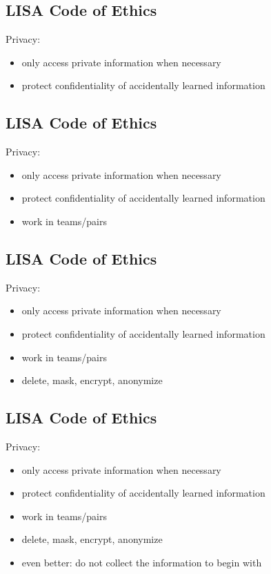 \documentclass[xga]{xdvislides}
\begin{document}
\subsection{LISA Code of Ethics}
Privacy:
\begin{itemize}
	\item only access private information when necessary
	\item protect confidentiality of accidentally learned information
\end{itemize}

\subsection{LISA Code of Ethics}
Privacy:
\begin{itemize}
	\item only access private information when necessary
	\item protect confidentiality of accidentally learned information
	\item work in teams/pairs
\end{itemize}

\subsection{LISA Code of Ethics}
Privacy:
\begin{itemize}
	\item only access private information when necessary
	\item protect confidentiality of accidentally learned information
	\item work in teams/pairs
	\item delete, mask, encrypt, anonymize
\end{itemize}

\subsection{LISA Code of Ethics}
Privacy:
\begin{itemize}
	\item only access private information when necessary
	\item protect confidentiality of accidentally learned information
	\item work in teams/pairs
	\item delete, mask, encrypt, anonymize
	\item even better: do not collect the information to begin with
\end{itemize}
\end{document}
